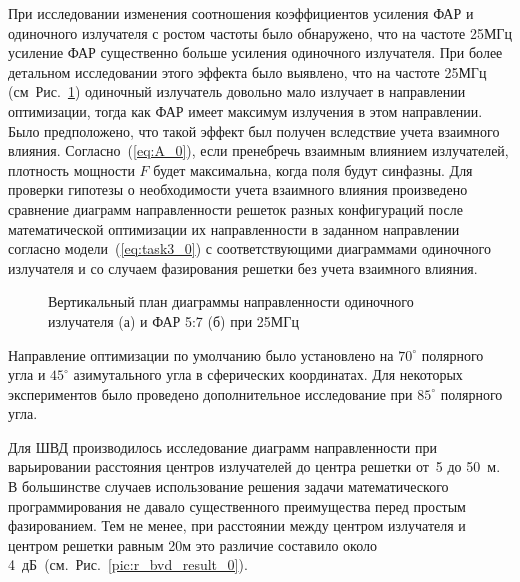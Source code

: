 При исследовании изменения соотношения коэффициентов усиления ФАР и одиночного излучателя с ростом частоты было обнаружено, что на частоте 25МГц усиление ФАР существенно больше усиления одиночного излучателя. При более детальном исследовании этого эффекта было выявлено, что на частоте 25МГц (см~Рис.~\ref{ris:f25mhs_0}) одиночный излучатель довольно мало излучает в направлении оптимизации, тогда как ФАР имеет максимум излучения в этом направлении. Было предположено, что такой эффект был получен вследствие учета взаимного влияния. Согласно~(\ref{eq:A_0}), если пренебречь взаимным влиянием излучателей, плотность мощности $F$ будет максимальна, когда поля будут синфазны. Для проверки гипотезы о необходимости учета взаимного влияния произведено сравнение диаграмм направленности решеток разных конфигураций после математической оптимизации их направленности в заданном направлении согласно модели~(\ref{eq:task3_0}) с соответствующими диаграммами одиночного излучателя и со случаем фазирования решетки без учета взаимного влияния.

\begin{figure}[!h]
\begin{minipage}[h]{0.49\linewidth}
\end{minipage}
\hfill
\begin{minipage}[h]{0.49\linewidth}
\end{minipage}
\caption{Вертикальный план диаграммы направленности одиночного излучателя (а) и ФАР 5:7 (б) при 25МГц}
\label{ris:f25mhs_0}
\end{figure}

Направление оптимизации по умолчанию было установлено на $70^{\circ}$ полярного угла и $45^{\circ}$ азимутального угла в сферических координатах. Для некоторых экспериментов было проведено дополнительное исследование при $85^{\circ}$ полярного угла.


Для ШВД производилось исследование диаграмм направленности при варьировании расстояния центров излучателей до центра решетки от~5 до 50~м. В большинстве случаев использование решения задачи математического программирования не давало существенного преимущества перед простым фазированием. Тем не менее, при расстоянии между центром излучателя и центром решетки равным 20м это различие составило около 4~дБ~(см.~Рис.~\ref{pic:r_bvd_result_0}).

